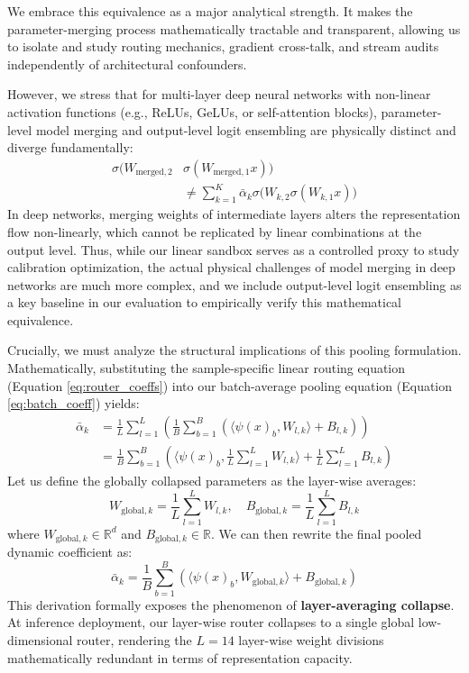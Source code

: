 We embrace this equivalence as a major analytical strength. It makes the parameter-merging process
mathematically tractable and transparent, allowing us to isolate and study routing mechanics,
gradient cross-talk, and stream audits independently of architectural confounders. 

However, we stress that for multi-layer deep neural networks with non-linear activation functions
(e.g., ReLUs, GeLUs, or self-attention blocks), parameter-level model merging and output-level logit
ensembling are physically distinct and diverge fundamentally:
\begin{align}
\sigma\big( W_{\text{merged}, 2} &\sigma( W_{\text{merged}, 1} x ) \big) \nonumber \\
&\neq \sum_{k=1}^K \bar{\alpha}_k \sigma\big( W_{k, 2} \sigma( W_{k, 1} x ) \big)
\label{eq:deep_merging_divergence}
\end{align}
In deep networks, merging weights of intermediate layers alters the representation flow
non-linearly, which cannot be replicated by linear combinations at the output level. Thus, while our
linear sandbox serves as a controlled proxy to study calibration optimization, the actual physical
challenges of model merging in deep networks are much more complex, and we include output-level
logit ensembling as a key baseline in our evaluation to empirically verify this mathematical
equivalence.

Crucially, we must analyze the structural implications of this pooling formulation. Mathematically,
substituting the sample-specific linear routing equation (Equation \ref{eq:router_coeffs}) into our
batch-average pooling equation (Equation \ref{eq:batch_coeff}) yields:
\begin{align}
\bar{\alpha}_k &= \frac{1}{L} \sum_{l=1}^L \left( \frac{1}{B} \sum_{b=1}^B \left( \langle \psi(x)_b, W_{l, k} \rangle + B_{l, k} \right) \right) \nonumber \\
&= \frac{1}{B} \sum_{b=1}^B \left( \langle \psi(x)_b, \frac{1}{L} \sum_{l=1}^L W_{l, k} \rangle +
\frac{1}{L} \sum_{l=1}^L B_{l, k} \right)
\label{eq:collapse_proof}
\end{align}
Let us define the globally collapsed parameters as the layer-wise averages:
\begin{equation}
W_{\text{global}, k} = \frac{1}{L} \sum_{l=1}^L W_{l, k}, \quad B_{\text{global}, k} = \frac{1}{L}
\sum_{l=1}^L B_{l, k}
\label{eq:collapsed_params}
\end{equation}
where $W_{\text{global}, k} \in \mathbb{R}^d$ and $B_{\text{global}, k} \in \mathbb{R}$. We can
then rewrite the final pooled dynamic coefficient as:
\begin{equation}
\bar{\alpha}_k = \frac{1}{B} \sum_{b=1}^B \left( \langle \psi(x)_b, W_{\text{global}, k} \rangle + B_{\text{global}, k} \right)
\label{eq:collapsed_coeff}
\end{equation}
This derivation formally exposes the phenomenon of \textbf{layer-averaging collapse}. At inference
deployment, our layer-wise router collapses to a single global low-dimensional router, rendering the
$L=14$ layer-wise weight divisions mathematically redundant in terms of representation capacity. 

